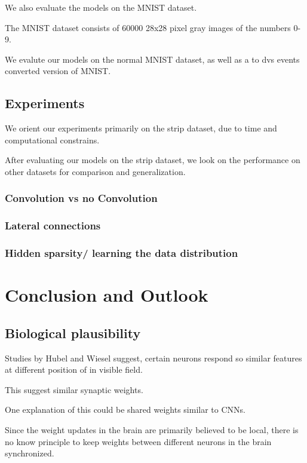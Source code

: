 We also evaluate the models on the MNIST dataset. 

The MNIST dataset consists of 60000 28x28 pixel gray images of the numbers 0-9.

We evalute our models on the normal MNIST dataset, as well as a to dvs events converted version of MNIST.

\section{Experiments}

We orient our experiments primarily on the strip dataset, due to time and computational constrains.

After evaluating our models on the strip dataset, we look on the performance on other datasets for comparison and generalization.     

\subsection{Convolution vs no Convolution}

\subsection{Lateral connections}

\subsection{Hidden sparsity/ learning the data distribution}


\chapter{Conclusion and Outlook}

\section{Biological plausibility}

Studies by Hubel and Wiesel suggest, certain neurons respond so similar features at different position of in visible field.

This suggest similar synaptic weights. 

One explanation of this could be shared weights similar to CNNs. 

Since the weight updates in the brain are primarily believed to be local, there is no know principle to keep weights between different neurons in the brain synchronized.

